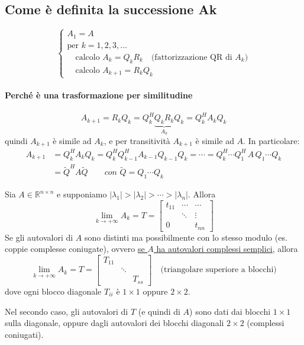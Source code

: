 \documentclass[12pt,a4paper,]{report}
\begin{document}
\subsection{Come è definita la successione Ak}
\begin{definizione}
    \[
    \begin{cases}
        A_1 = A\\
        \text{per } k=1,2,3,\dots\\
        \quad \text{calcolo } A_k = Q_kR_k \quad \text{(fattorizzazione QR di $A_k$)}\\
        \quad \text{calcolo } A_{k+1} = R_kQ_k
    \end{cases}
    \]
\end{definizione}
\paragraph{Perché è una trasformazione per similitudine}
    \[
    A_{k+1} = R_kQ_k = Q_k^H\underbrace{Q_kR_k}_{A_k}Q_k = Q_k^HA_kQ_k
    \]
    quindi $A_{k+1}$ è simile ad $A_k$, e per transitività $A_{k+1}$ è simile ad $A$. In particolare:
    \[
    \begin{split}
    A_{k+1} &= Q_k^HA_kQ_k = Q_k^HQ_{k-1}^HA_{k-1}Q_{k-1}Q_k = \cdots = Q_k^H\cdots Q_1^H\,A\,Q_1\cdots Q_k \\
    &= \tilde{Q}^HA\tilde{Q} \qquad \textit{con }\tilde{Q} = Q_1\cdots Q_k
    \end{split}
    \]

\begin{teorema}
    Sia $A\in\mathbb{R}^{n\times n}$ e supponiamo $|\lambda_1|>|\lambda_2|>\cdots>|\lambda_n|$. Allora
    \[
    \lim_{k\to+\infty}A_k = T = \begin{bmatrix} t_{11} & \cdots & \cdots\\ & \ddots & \vdots \\ 0 & & t_{nn}\end{bmatrix} 
    \]
    Se gli autovalori di $A$ sono distinti ma possibilmente con lo stesso modulo (es. coppie complesse coniugate), ovvero \uline{se $A$ ha autovalori complessi semplici}, allora
    \[
    \lim_{k\to+\infty}A_k = T = \begin{bmatrix} T_{11} & & \\ & \ddots & \\ & & T_{ss}\end{bmatrix} \quad \text{(triangolare superiore a blocchi)}
    \]
    dove ogni blocco diagonale $T_{ii}$ è $1\times1$ oppure $2\times2$.
\end{teorema}
\begin{nota}
    Nel secondo caso, gli autovalori di $T$ (e quindi di $A$) sono dati dai blocchi $1\times1$ sulla diagonale, oppure dagli autovalori dei blocchi diagonali $2\times2$ (complessi coniugati).
\end{nota}
\end{document}

